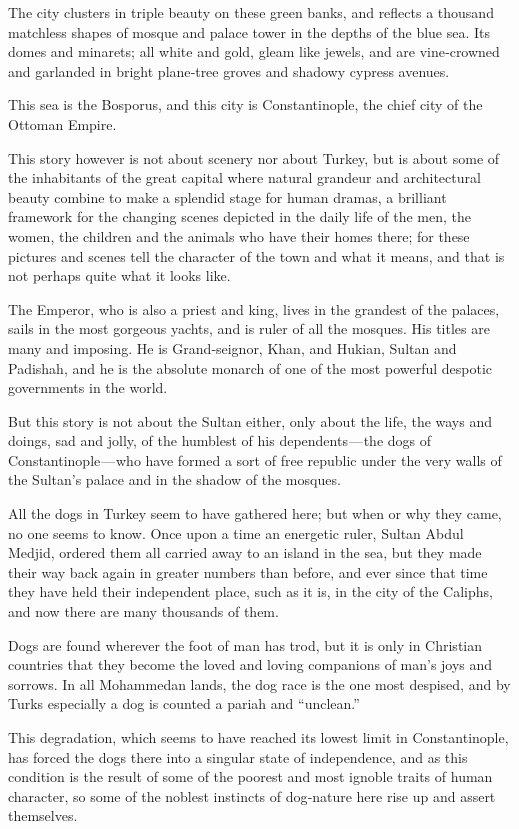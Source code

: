 \documentclass[12pt]{book}
\begin{document}
The city clusters in triple beauty on these green banks, and reflects a thousand
matchless shapes of mosque and palace tower in the depths of the blue sea. Its
domes and minarets; all white and gold, gleam like jewels, and are vine‐crowned
and garlanded in bright plane‐tree groves and shadowy cypress avenues.

This sea is the Bosporus, and this city is Constantinople, the chief city of the
Ottoman Empire.

This story however is not about scenery nor about Turkey, but is about some
of the inhabitants of the great capital where natural grandeur and architectural
beauty combine to make a splendid stage for human dramas, a brilliant framework
for the changing scenes depicted in the daily life of the men, the women, the
children and the animals who have their homes there; for these pictures and
scenes tell the character of the town and what it means, and that is not perhaps
quite what it looks like.

The Emperor, who is also a priest and king, lives in the grandest of the palaces,
sails in the most gorgeous yachts, and is ruler of all the mosques. His titles are
many and imposing. He is Grand‐seignor, Khan, and Hukian, Sultan and Padishah,
and he is the absolute monarch of one of the most powerful despotic governments
in the world.

But this story is not about the Sultan either, only about the life, the ways and
doings, sad and jolly, of the humblest of his dependents — the dogs of Constantinople — who have formed a sort of free republic under the very walls of the Sultan’s
palace and in the shadow of the mosques.

All the dogs in Turkey seem to have gathered here; but when or why they
came, no one seems to know. Once upon a time an energetic ruler, Sultan Abdul
Medjid, ordered them all carried away to an island in the sea, but they made their
way back again in greater numbers than before, and ever since that time they
have held their independent place, such as it is, in the city of the Caliphs, and
now there are many thousands of them.

Dogs are found wherever the foot of man has trod, but it is only in Christian
countries that they become the loved and loving companions of man’s joys and
sorrows. In all Mohammedan lands, the dog race is the one most despised, and
by Turks especially a dog is counted a pariah and “unclean.”

This degradation, which seems to have reached its lowest limit in Constantinople, has forced the dogs there into a singular state of independence, and as this
condition is the result of some of the poorest and most ignoble traits of human
character, so some of the noblest instincts of dog‐nature here rise up and assert
themselves.
\end{document}
